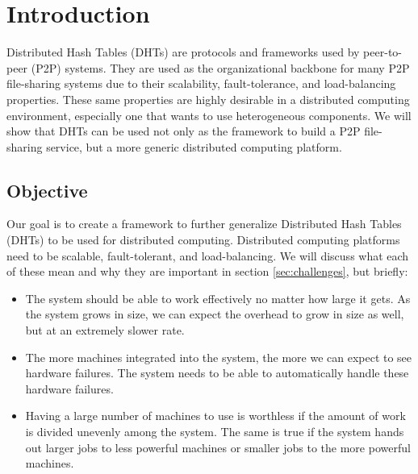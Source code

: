 \chapter{Introduction}
\label{chapter:intro}


Distributed Hash Tables (DHTs) are protocols and frameworks used by peer-to-peer (P2P) systems.
They are used as the organizational backbone for many P2P file-sharing systems due to their scalability, fault-tolerance, and load-balancing properties.
These same properties are highly desirable in a distributed computing environment, especially one that wants to use heterogeneous components.
We will show that DHTs can be used not only as the framework to build a P2P file-sharing service, but a more generic distributed computing platform.


\section{Objective}
Our goal is to create a framework to further generalize Distributed Hash Tables (DHTs) to be used for distributed computing.
Distributed computing platforms need to be scalable, fault-tolerant, and load-balancing.
We will discuss what each of these mean and why they are important in section \ref{sec:challenges}, but briefly:

\begin{itemize}
	\item The system should be able to work effectively no matter how large it gets.
	As the system grows in size, we can expect the overhead to grow in size as well, but at an extremely slower rate.
	\item The more machines integrated into the system, the more we can expect to see hardware failures.
	The system needs to be able to automatically handle these hardware failures.
	\item Having a large number of machines to use is worthless if the amount of work is divided unevenly among the system.
	The same is true if the system hands out larger jobs to less powerful machines or smaller jobs to the more powerful machines.
\end{itemize}


